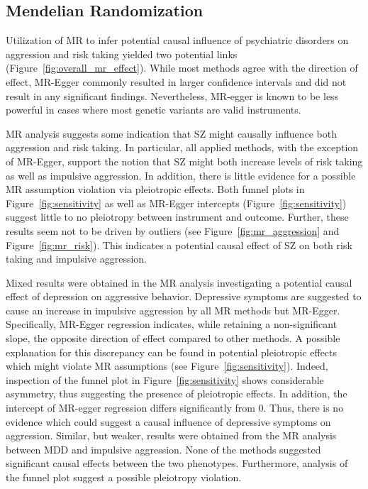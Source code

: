 \subsection{Mendelian Randomization}
\label{sub:mendelian_randomization}

Utilization of MR to infer potential causal influence of psychiatric disorders on aggression and risk taking yielded two potential links (Figure~\ref{fig:overall_mr_effect}).
While most methods agree with the direction of effect, MR-Egger commonly resulted in larger confidence intervals and did not result in any significant findings.
Nevertheless, MR-egger is known to be less powerful in cases where most  genetic variants are valid instruments.

MR analysis suggests some indication that SZ might causally influence both aggression and risk taking.
In particular, all applied methods, with the exception of MR-Egger, support the notion that SZ might both increase levels of risk taking as well as impulsive aggression.
In addition, there is little evidence for a possible MR assumption violation via pleiotropic effects.
Both funnel plots in Figure~\ref{fig:sensitivity} as well as MR-Egger intercepts (Figure~\ref{fig:sensitivity}) suggest little to no pleiotropy between instrument and outcome.
Further, these results seem not to be driven by outliers (see Figure~\ref{fig:mr_aggression} and Figure~\ref{fig:mr_risk}).
This indicates a potential causal effect of SZ on both risk taking and impulsive aggression.

Mixed results were obtained in the MR analysis investigating a potential causal effect of depression on aggressive behavior.
Depressive symptoms are suggested to cause an increase in impulsive aggression by all MR methods but MR-Egger.
Specifically, MR-Egger regression indicates, while retaining a non-significant slope, the opposite direction of effect compared to other  methods.  
A possible explanation for this discrepancy can be found in potential pleiotropic effects which might violate MR assumptions (see Figure~\ref{fig:sensitivity}).
Indeed, inspection of the funnel plot in Figure~\ref{fig:sensitivity} shows considerable asymmetry, thus suggesting the presence of pleiotropic effects.
In addition, the intercept of MR-egger regression differs significantly from $0$.
Thus, there is no evidence which could suggest a causal influence of depressive symptoms on aggression. 
Similar, but weaker, results were obtained from the MR analysis between MDD and impulsive aggression.
None of the  methods suggested significant causal effects between the two phenotypes. 
Furthermore, analysis of the funnel plot suggest a possible pleiotropy violation.

